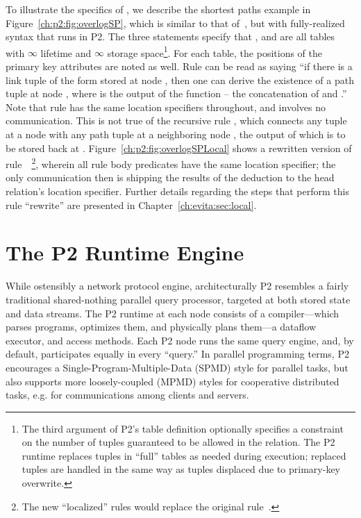 To illustrate the specifics of \OVERLOG, we describe the shortest paths example
in Figure~\ref{ch:p2:fig:overlogSP}, which is similar to that
of~\cite{loo-sigmod06}, but with fully-realized \OVERLOG syntax that runs in
P2.  The three  statements specify that , 
and  are all tables with $\infty$ lifetime and $\infty$ storage
space\footnote{The third argument of P2's table definition optionally specifies
a constraint on the number of tuples guaranteed to be allowed in the relation.
The P2 runtime replaces tuples in ``full'' tables as needed during execution;
replaced tuples are handled in the same way as tuples displaced due to
primary-key overwrite.}.  For each table, the positions of the primary key
attributes are noted as well.  Rule  can be read as saying ``if there is
a link tuple of the form  stored at node , then one can
derive the existence of a path tuple  at node , where
 is the output of the function  -- the concatenation of
 and .'' Note that rule  has the same location specifiers
throughout, and involves no communication.  This is not true of the recursive
rule , which connects any  tuple at a node  with any path
tuple at a neighboring node , the output of which is to be stored back at
.  Figure~\ref{ch:p2:fig:overlogSPLocal} shows a rewritten version of
rule~~\footnote{The new ``localized'' rules would replace the original
rule~.}, wherein all rule body predicates have the same location
specifier; the only communication then is shipping the results of the deduction
to the head relation's location specifier.  Further details regarding the steps
that perform this rule ``rewrite'' are presented in
Chapter~\ref{ch:evita:sec:local}.

\section{The P2 Runtime Engine}
\label{ch:p2:sec:p2}

While ostensibly a network protocol engine, architecturally P2 resembles a
fairly traditional shared-nothing parallel query processor, targeted at both
stored state and data streams.  The P2 runtime at each node consists of a
compiler---which parses programs, optimizes them, and physically plans them---a
dataflow executor, and access methods.  Each P2 node runs the same query
engine, and, by default, participates equally in every ``query.'' In parallel
programming terms, P2 encourages a Single-Program-Multiple-Data (SPMD) style
for parallel tasks, but also supports more loosely-coupled (MPMD) styles for
cooperative distributed tasks, e.g.  for communications among clients and
servers.


